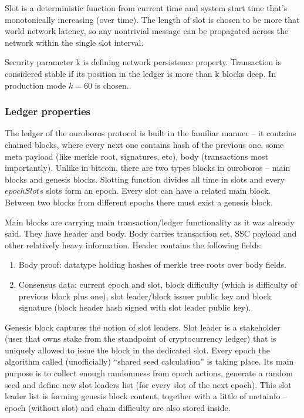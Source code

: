\documentclass[]{itmo-student-thesis}
\begin{document}
Slot is a deterministic function from current time and system start
time that’s monotonically increasing (over time). The length of slot
is chosen to be more that world network latency, so any nontrivial
message can be propagated across the network within the single slot
interval.

Security parameter k is defining network persistence
property. Transaction is considered stable if its position in the
ledger is more than k blocks deep. In production mode $k=60$ is
chosen.

\subsubsection{Ledger properties}

The ledger of the ouroboros protocol is built in the familiar manner
-- it contains chained blocks, where every next one contains hash of
the previous one, some meta payload (like merkle root, signatures,
etc), body (transactions most importantly). Unlike in bitcoin, there
are two types blocks in ouroboros -- main blocks and genesis
blocks. Slotting function divides all time in slots and every
$epochSlots$ slots form an epoch. Every slot can have a related main
block. Between two blocks from different epochs there must exist a
genesis block.

Main blocks are carrying main transaction/ledger functionality as it
was already said. They have header and body. Body carries transaction
set, SSC payload and other relatively heavy information. Header
contains the following fields:

\begin{enumerate}
\item Body proof: datatype holding hashes of merkle tree roots over body
fields.

\item Consensus data: current epoch and slot, block difficulty (which is
difficulty of previous block plus one), slot leader/block issuer
public key and block signature (block header hash signed with slot
leader public key).

\end{enumerate}

Genesis block captures the notion of slot leaders. Slot leader is a
stakeholder (user that owns stake from the standpoint of
cryptocurrency ledger) that is uniquely allowed to issue the block in
the dedicated slot. Every epoch the algorithm called (unofficially)
“shared seed calculation” is taking place. Its main purpose is to
collect enough randomness from epoch actions, generate a random seed
and define new slot leaders list (for every slot of the next
epoch). This slot leader list is forming genesis block content,
together with a little of metainfo -- epoch (without slot) and chain
difficulty are also stored inside.
\end{document}
